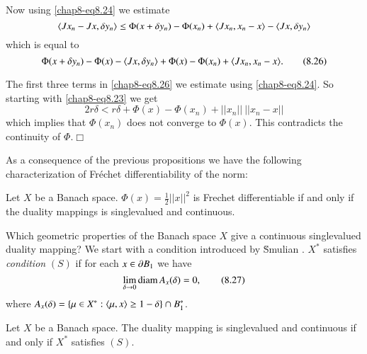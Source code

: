Now using \eqref{chap8-eq8.24} we estimate
$$
\langle Jx_{n}-Jx,\delta y_{n}\rangle\leq \Phi(x+\delta y_{n})-\Phi(x_{n})+\langle
Jx_{n},x_{n}-x\rangle-\langle Jx,\delta y_{n}\rangle 
$$
which is equal to
\begin{equation*}
\Phi(x+\delta y_{n})-\Phi(x)-\langle Jx,\delta
y_{n}\rangle+\Phi(x)-\Phi(x_{n})+\langle
Jx_{n},x_{n}-x\rangle.\tag{8.26}\label{chap8-eq8.26} 
\end{equation*}

The first three terms in \eqref{chap8-eq8.26} we estimate using
\eqref{chap8-eq8.24}. So starting with \eqref{chap8-eq8.23} we get
$$
2r\delta<r\delta+\Phi(x)-\Phi(x_{n})+||x_{n}||~||x_{n}-x||
$$
which implies that $\Phi(x_{n})$ does not converge to $\Phi(x)$. This
contradicts the continuity of $\Phi$.\hfill$\Box$ 

As a consequence of the previous propositions we have the following
characterization of Fr\'echet differentiability of the norm:

\begin{proposition}\label{chap8-prop8.8}
Let $X$ be a Banach space. $\Phi(x)=\frac{1}{2}||x||^{2}$ is Frechet
differentiable if and only if the duality mappings is singlevalued and
continuous. 
\end{proposition}

\begin{remark*}
Which geometric properties of the Banach space $X$ give a continuous
singlevalued duality mapping? We start with a condition introduced by
\u{S}mulian \cite{key75}. $X^{*}$ satisfies {\em condition} $(S)$ if
for each $x\in \partial B_{1}$ we have
\begin{equation*}
\lim\limits_{\delta\to 0}\operatorname{diam}
A_{x}(\delta)=0,\tag{8.27}\label{chap8-eq8.27} 
\end{equation*}
where $A_{x}(\delta)=\{\mu\in X^{*}:\langle \mu,x\rangle\geq 1-\delta\}\cap
B^{*}_{1}$. 
\end{remark*}

\begin{proposition}\label{chap8-prop8.9}
Let $X$ be a Banach space. The duality mapping is singlevalued and
continuous if and only if $X^{*}$ satisfies $(S)$.
\end{proposition}

